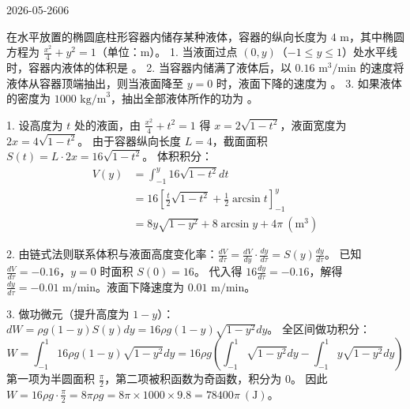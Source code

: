 \begin{mistake}{2026-05-26}{06}

\begin{problemcontent}
在水平放置的椭圆底柱形容器内储存某种液体，容器的纵向长度为 \(4\text{ m}\)，其中椭圆方程为 \(\frac{x^2}{4} + y^2 = 1\)（单位：\(\text{m}\)）。
1. 当液面过点 \((0, y)\)（\(-1 \leqslant y \leqslant 1\)）处水平线时，容器内液体的体积是 \underline{\quad\quad}。
2. 当容器内储满了液体后，以 \(0.16\text{ m}^3/\text{min}\) 的速度将液体从容器顶端抽出，则当液面降至 \(y=0\) 时，液面下降的速度为 \underline{\quad\quad}。
3. 如果液体的密度为 \(1000\text{ kg/m}^3\)，抽出全部液体所作的功为 \underline{\quad\quad}。
\end{problemcontent}

\begin{solutioncontent}
1. 设高度为 \(t\) 处的液面，由 \(\frac{x^2}{4} + t^2 = 1\) 得 \(x = 2\sqrt{1-t^2}\)，液面宽度为 \(2x = 4\sqrt{1-t^2}\)。
由于容器纵向长度 \(L = 4\)，截面面积 \(S(t) = L \cdot 2x = 16\sqrt{1-t^2}\)。
体积积分：
\[
\begin{aligned}
V(y) &= \int_{-1}^{y} 16\sqrt{1-t^2} dt \\
&= 16 \left[ \frac{t}{2}\sqrt{1-t^2} + \frac{1}{2}\arcsin t \right]_{-1}^{y} \\
&= 8y\sqrt{1-y^2} + 8\arcsin y + 4\pi \ (\text{m}^3)
\end{aligned}
\]

2. 由链式法则联系体积与液面高度变化率：\(\frac{dV}{d\tau} = \frac{dV}{dy} \cdot \frac{dy}{d\tau} = S(y) \frac{dy}{d\tau}\)。
已知 \(\frac{dV}{d\tau} = -0.16\)，\(y=0\) 时面积 \(S(0) = 16\)。
代入得 \(16 \frac{dy}{d\tau} = -0.16\)，解得 \(\frac{dy}{d\tau} = -0.01\text{ m/min}\)。液面下降速度为 \(0.01\text{ m/min}\)。

3. 做功微元（提升高度为 \(1-y\)）：\(dW = \rho g (1-y) S(y) dy = 16\rho g (1-y)\sqrt{1-y^2} dy\)。
全区间做功积分：
\[
W = \int_{-1}^{1} 16\rho g (1-y)\sqrt{1-y^2} dy = 16\rho g \left( \int_{-1}^{1} \sqrt{1-y^2} dy - \int_{-1}^{1} y\sqrt{1-y^2} dy \right)
\]
第一项为半圆面积 \(\frac{\pi}{2}\)，第二项被积函数为奇函数，积分为 \(0\)。
因此 \(W = 16\rho g \cdot \frac{\pi}{2} = 8\pi \rho g = 8\pi \times 1000 \times 9.8 = 78400\pi \ (\text{J})\)。
\end{solutioncontent}


\end{mistake}
